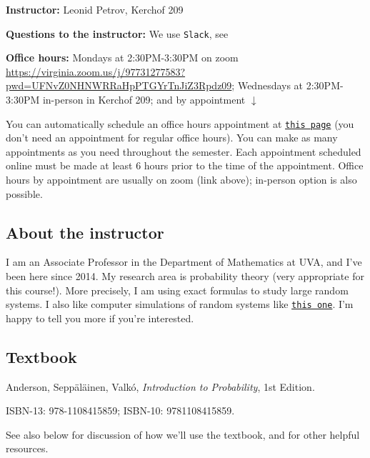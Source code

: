 \documentclass[oneside,11pt]{amsart}
\begin{document}
\bigskip

\textbf{Instructor:} Leonid Petrov, Kerchof 209

	\textbf{Questions to the instructor:} We use \texttt{Slack}, see 

	\textbf{Office hours:} 
	Mondays at 2:30PM-3:30PM on zoom
	\url{https://virginia.zoom.us/j/97731277583?pwd=UFNvZ0NHNWRRaHpPTGYrTnJiZ3Rpdz09};
	Wednesdays at 2:30PM-3:30PM in-person in Kerchof 209; and by appointment $\downarrow$
	
	You can automatically schedule an office hours appointment 
	at \href{https://lpetrov.cc/teaching/}{\texttt{this page}} (you don't need an appointment for 
	regular office hours).
	You can make as many appointments as you need throughout the semester.
	Each appointment scheduled online
	must be made at least 6 hours prior to the time of the appointment.
	Office hours by appointment are usually on zoom (link above); 
	in-person option is also possible.
	
\subsection{About the instructor}
I am an Associate Professor in the Department of Mathematics at UVA, and I've
been here since 2014. My research area is probability theory (very appropriate
for this course!). More precisely, I am using exact formulas to study large
random systems. I also like computer simulations of random systems like 
\href{https://d3m0khvr0ybm92.cloudfront.net/img/blog/heart/UVA_colors_small.png}{\texttt{this one}}.
I'm happy to tell you more if you're
interested.

\subsection{Textbook}
\label{sub:main_textbook}

Anderson, Sepp\"al\"ainen, Valk\'o, \emph{Introduction to Probability}, 1st Edition.

ISBN-13: 978-1108415859; 
ISBN-10: 9781108415859.

See also  below for discussion 
of how we'll use the textbook,
and for other helpful resources.

%
\end{document}

